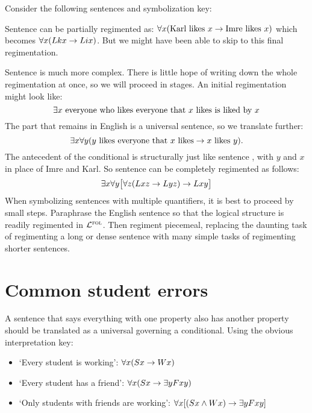 
Consider the following sentences and symbolization key:

\begin{earg} \label{likes}
\end{earg}

\begin{ekey}
\end{ekey}

Sentence  can be partially regimented as: $\forall x(\mbox{Karl likes $x$}\rightarrow\mbox{Imre likes $x$})$ which becomes $\forall x(Lkx\rightarrow Lix)$.
But we might have been able to skip to this final regimentation.

Sentence  is much more complex.
There is little hope of writing down the whole regimentation at once, so we will proceed in stages.
An initial regimentation might look like:
  $$\exists x\ \mbox{everyone who likes everyone that $x$ likes is liked by $x$}$$
The part that remains in English is a universal sentence, so we translate further: $$\exists x\forall y(\mbox{$y$ likes everyone that $x$ likes}\rightarrow\mbox{$x$ likes $y$}).$$
The antecedent of the conditional is structurally just like sentence , with $y$ and $x$ in place of Imre and Karl.
So sentence  can be completely regimented as follows: $$\exists x\forall y\bigl[\forall z(Lxz \rightarrow Lyz) \rightarrow Lxy\bigr]$$
When symbolizing sentences with multiple quantifiers, it is best to proceed by small steps.
Paraphrase the English sentence so that the logical structure is readily regimented in $\mathcal{L}^{\textsc{fol}}$.
Then regiment piecemeal, replacing the daunting task of regimenting a long or dense sentence with many simple tasks of regimenting shorter sentences.




\iffalse

\section{Common student errors}

A sentence that says everything with one property also has another property should be translated as a universal governing a conditional. Using the obvious interpretation key:

\begin{itemize}
\item `Every student is working': $\forall x (Sx \rightarrow Wx)$
\item `Every student has a friend': $\forall x (Sx \rightarrow \exists y Fxy)$
\item `Only students with friends are working': $\forall x [(Sx \wedge Wx) \rightarrow \exists y Fxy]$
\end{itemize}

